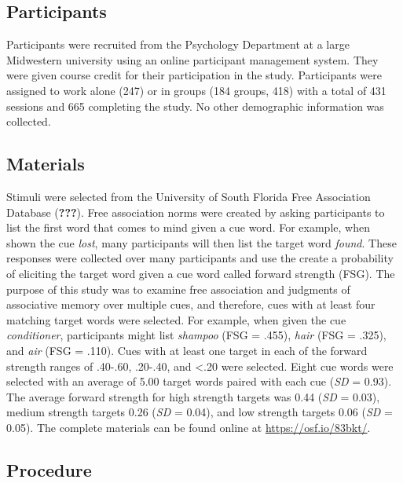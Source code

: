\documentclass[man]{apa6}
\begin{document}
\hypertarget{participants}{%
\subsection{Participants}\label{participants}}

Participants were recruited from the Psychology Department at a large Midwestern university using an online participant management system. They were given course credit for their participation in the study. Participants were assigned to work alone (247) or in groups (184 groups, 418) with a total of 431 sessions and 665 completing the study. No other demographic information was collected.

\hypertarget{materials}{%
\subsection{Materials}\label{materials}}

Stimuli were selected from the University of South Florida Free Association Database ({\textbf{???}}). Free association norms were created by asking participants to list the first word that comes to mind given a cue word. For example, when shown the cue \emph{lost}, many participants will then list the target word \emph{found}. These responses were collected over many participants and use the create a probability of eliciting the target word given a cue word called forward strength (FSG). The purpose of this study was to examine free association and judgments of associative memory over multiple cues, and therefore, cues with at least four matching target words were selected. For example, when given the cue \emph{conditioner}, participants might list \emph{shampoo} (FSG = .455), \emph{hair} (FSG = .325), and \emph{air} (FSG = .110). Cues with at least one target in each of the forward strength ranges of .40-.60, .20-.40, and \textless{}.20 were selected. Eight cue words were selected with an average of 5.00 target words paired with each cue (\emph{SD} = 0.93). The average forward strength for high strength targets was 0.44 (\emph{SD} = 0.03), medium strength targets 0.26 (\emph{SD} = 0.04), and low strength targets 0.06 (\emph{SD} = 0.05). The complete materials can be found online at \url{https://osf.io/83bkt/}.

\hypertarget{procedure}{%
\subsection{Procedure}\label{procedure}}
\end{document}
